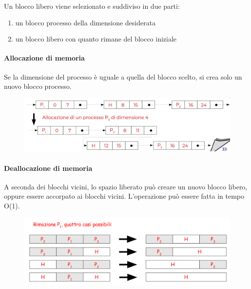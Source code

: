 Un blocco libero viene selezionato e suddiviso in due parti:
\begin{enumerate}
    \item un blocco processo della dimensione desiderata
    \item un blocco libero con quanto rimane del blocco iniziale
\end{enumerate}

\paragraph{Allocazione di memoria}
Se la dimensione del processo è uguale a quella del blocco scelto, si crea solo un nuovo blocco processo.
\begin{figure} [h]
    \centering
    \includegraphics[width=0.7\linewidth]{Images/Screenshot 2025-01-17 at 15-35-24 so-05-memoria - so-05-memoria.pdf.png}
\end{figure}

\paragraph{Deallocazione di memoria}
A seconda dei blocchi vicini, lo spazio liberato può creare un nuovo blocco libero, oppure essere accorpato ai blocchi vicini.
L'operazione può essere fatta in tempo O(1).

\begin{figure} [h]
    \centering
    \includegraphics[width=0.7\linewidth]{Images/Screenshot 2025-01-17 at 15-37-05 so-05-memoria - so-05-memoria.pdf.png}
\end{figure}

